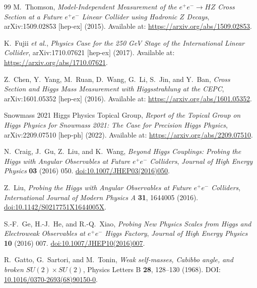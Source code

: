 \documentclass[10pt,a4paper]{article}
\begin{document}
\begin{thebibliography}{99}
	M.~Thomson,
	\textit{Model-Independent Measurement of the $e^+e^-\to HZ$ Cross Section
		at a Future $e^+e^-$ Linear Collider using Hadronic $Z$ Decays},
	arXiv:1509.02853 [hep-ex] (2015).
	Available at:
	\href{https://arxiv.org/abs/1509.02853}
	{https://arxiv.org/abs/1509.02853}.
	
	K.~Fujii \textit{et al.},
	\textit{Physics Case for the 250 GeV Stage of the International Linear Collider},
	arXiv:1710.07621 [hep-ex] (2017).
	Available at:
	\href{https://arxiv.org/abs/1710.07621}
	{https://arxiv.org/abs/1710.07621}.
	
	Z.~Chen, Y.~Yang, M.~Ruan, D.~Wang, G.~Li, S.~Jin, and Y.~Ban,
	\textit{Cross Section and Higgs Mass Measurement with Higgsstrahlung at the CEPC},
	arXiv:1601.05352 [hep-ex] (2016).
	Available at:
	\href{https://arxiv.org/abs/1601.05352}
	{https://arxiv.org/abs/1601.05352}.
	
	Snowmass 2021 Higgs Physics Topical Group,
	\textit{Report of the Topical Group on Higgs Physics for Snowmass 2021:
		The Case for Precision Higgs Physics},
	arXiv:2209.07510 [hep-ph] (2022).
	Available at:
	\href{https://arxiv.org/abs/2209.07510}
	{https://arxiv.org/abs/2209.07510}.
	
	N.~Craig, J.~Gu, Z.~Liu, and K.~Wang,
	\textit{Beyond Higgs Couplings: Probing the Higgs with Angular Observables
		at Future $e^+e^-$ Colliders},
	\textit{Journal of High Energy Physics} \textbf{03} (2016) 050.
	\href{https://doi.org/10.1007/JHEP03(2016)050}
	{doi:10.1007/JHEP03(2016)050}.
	
	Z.~Liu,
	\textit{Probing the Higgs with Angular Observables at Future
		$e^+e^-$ Colliders},
	\textit{International Journal of Modern Physics A} \textbf{31},
	1644005 (2016).
	\href{https://doi.org/10.1142/S0217751X1644005X}
	{doi:10.1142/S0217751X1644005X}.
	
	S.-F.~Ge, H.-J.~He, and R.-Q.~Xiao,
	\textit{Probing New Physics Scales from Higgs and Electroweak Observables
		at $e^+e^-$ Higgs Factory},
	\textit{Journal of High Energy Physics} \textbf{10} (2016) 007.
	\href{https://doi.org/10.1007/JHEP10(2016)007}
	{doi:10.1007/JHEP10(2016)007}.
	
	R.~Gatto, G.~Sartori, and M.~Tonin,
	\textit{Weak self-masses, Cabibbo angle, and broken $SU(2) \times SU(2)$},
	Physics Letters B \textbf{28}, 128--130 (1968).
	DOI: \href{https://doi.org/10.1016/0370-2693(68)90150-0}{10.1016/0370-2693(68)90150-0}.
	

\end{thebibliography}
\end{document}
